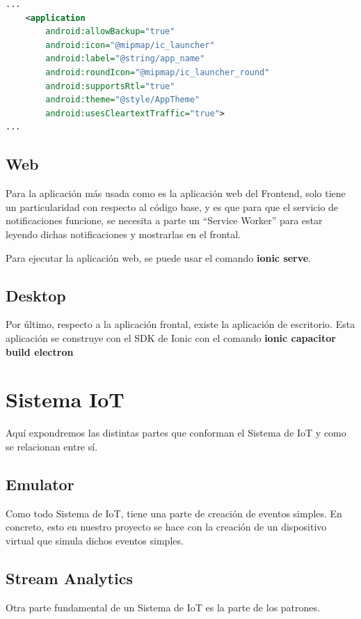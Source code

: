 \begin{lstlisting}[language=XML,caption={Fichero AndroidManifest.xml},captionpos=b]
...
    <application
        android:allowBackup="true"
        android:icon="@mipmap/ic_launcher"
        android:label="@string/app_name"
        android:roundIcon="@mipmap/ic_launcher_round"
        android:supportsRtl="true"
        android:theme="@style/AppTheme"
        android:usesCleartextTraffic="true">
...
\end{lstlisting}

\subsection{Web}
Para la aplicación más usada como es la aplicación web del Frontend, solo tiene un particularidad con respecto al código base, y es que para que el servicio de notificaciones funcione, se necesita a parte un ``Service Worker'' para estar leyendo dichas notificaciones y mostrarlas en el frontal.

Para ejecutar la aplicación web, se puede usar el comando \textbf{ionic serve}.

\subsection{Desktop}
Por último, respecto a la aplicación frontal, existe la aplicación de escritorio. Esta aplicación se construye con el SDK de Ionic con el comando \textbf{ionic capacitor build electron}

\section{Sistema IoT}
Aquí expondremos las distintas partes que conforman el Sistema de IoT y como se relacionan entre sí.

\subsection{Emulator}
Como todo Sistema de IoT, tiene una parte de creación de eventos simples. En concreto, esto en nuestro proyecto se hace con la creación de un dispositivo virtual que simula dichos eventos simples.

\subsection{Stream Analytics}
Otra parte fundamental de un Sistema de IoT es la parte de los patrones.

